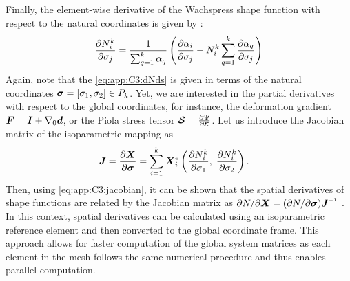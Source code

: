 Finally, the element-wise derivative of the Wachspress shape function with respect to the natural coordinates is given by \cite{Talischi2012Mar}:
%
\begin{equation}
\frac{\partial N^k_i}{\partial \sigma_j}= \frac{1}{\sum_{q=1}^k \alpha_q} \left(\frac{\partial \alpha_i}{\partial \sigma_j} - N_{i}^k \sum^{k}_{q=1} \frac{\partial \alpha_q}{\partial \sigma_j} \right)
\label{eq:app:C3:dNds}
\end{equation}
%
Again, note that the \eqref{eq:app:C3:dNds} is given in terms of the natural coordinates $\boldsymbol{\sigma} = [\sigma_1, \sigma_2] \in P_k$. Yet, we are interested in the partial derivatives with respect to the global coordinates, for instance, the deformation gradient ${\boldsymbol{F}} = \boldsymbol{I} + \nabla_0 {\boldsymbol{d}}$, or the Piola stress tensor $\boldsymbol{\mathcal{S}} = \frac{\partial \Psi}{\partial \boldsymbol{\mathcal{E}}}$. Let us introduce the Jacobian matrix of the isoparametric mapping as
%
\begin{align}
{\boldsymbol{J}} & = \frac{\partial {\boldsymbol{X}}}{\partial \boldsymbol{\sigma}} = \sum_{i=1}^k {\boldsymbol{X}}_i^{e} \left(\frac{\partial N^k_i}{\partial \sigma_1}, \; \frac{\partial N^k_i}{\partial \sigma_2} \right).
\label{eq:app:C3:jacobian}
\end{align}
%
Then, using \eqref{eq:app:C3:jacobian}, it can be shown that the spatial derivatives of shape functions are related by the Jacobian matrix as $\p N/\p \XB = (\p N/\p \sigmaB) \JB\inv$ \cite{Kim2018}. In this context, spatial derivatives can be calculated using an isoparametric reference element and then converted to the global coordinate frame. This approach allows for faster computation of the global system matrices as each element in the mesh follows the same numerical procedure and thus enables parallel computation.